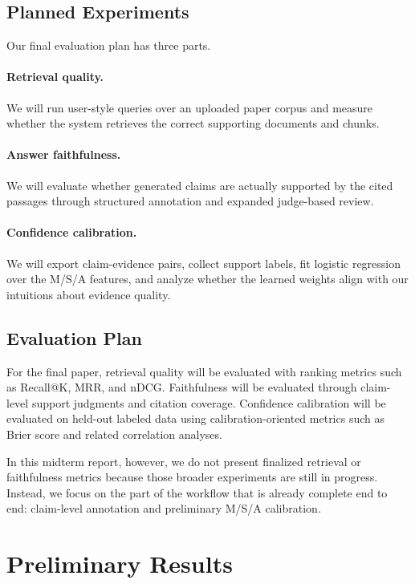 \documentclass[10pt]{article}
\begin{document}
\subsection{Planned Experiments}

Our final evaluation plan has three parts.

\paragraph{Retrieval quality.}
We will run user-style queries over an uploaded paper corpus and
measure whether the system retrieves the correct supporting documents
and chunks.

\paragraph{Answer faithfulness.}
We will evaluate whether generated claims are actually supported by the
cited passages through structured annotation and expanded judge-based
review.

\paragraph{Confidence calibration.}
We will export claim-evidence pairs, collect support labels, fit
logistic regression over the M/S/A features, and analyze whether the
learned weights align with our intuitions about evidence quality.

\subsection{Evaluation Plan}

For the final paper, retrieval quality will be evaluated with ranking
metrics such as Recall@K, MRR, and nDCG. Faithfulness will be
evaluated through claim-level support judgments and citation coverage.
Confidence calibration will be evaluated on held-out labeled data using
calibration-oriented metrics such as Brier score and related
correlation analyses.

In this midterm report, however, we do not present finalized retrieval
or faithfulness metrics because those broader experiments are still in
progress. Instead, we focus on the part of the workflow that is
already complete end to end: claim-level annotation and preliminary
M/S/A calibration.

\section{Preliminary Results}
\end{document}
